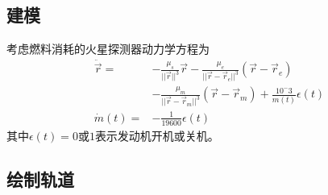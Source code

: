 \subsection{建模}
考虑燃料消耗的火星探测器动力学方程为
\begin{align*}
    \ddot{\vec{r}} =& -\frac{\mu_s}{||\vec{r}||^3}\vec{r}
    - \frac{\mu_e}{||\vec{r}-\vec{r}_e||^3}(\vec{r}-\vec{r}_e) \\
    &- \frac{\mu_m}{||\vec{r}-\vec{r}_m||^3}(\vec{r}-\vec{r}_m)
    + \frac{10^-3}{m(t)}\epsilon(t) \\
    \dot{m}(t) =& -\frac{1}{19600}\epsilon(t)
\end{align*}
其中$\epsilon(t)=0$或$1$表示发动机开机或关机。

\subsection{绘制轨道}


